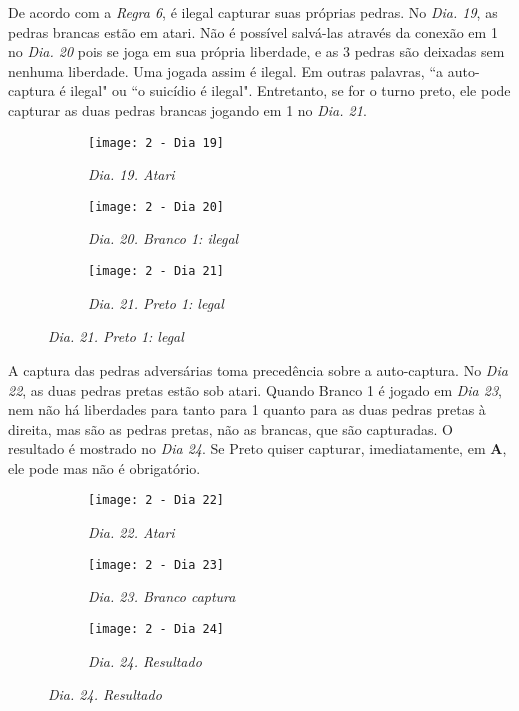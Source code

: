 \pagebreak

De acordo com a \emph{Regra 6}, é ilegal capturar suas próprias pedras. No \emph{Dia. 19}, as pedras brancas estão em atari. Não é possível salvá-las através da conexão em 1 no \emph{Dia. 20} pois se joga em sua própria liberdade, e as 3 pedras são deixadas sem nenhuma liberdade. Uma jogada assim é ilegal. Em outras palavras, ``a auto-captura é ilegal" ou ``o suicídio é ilegal". Entretanto, se for o turno preto, ele pode capturar as duas pedras brancas jogando em 1 no \emph{Dia. 21}.

\begin{figure}[h]
    \centering
    \begin{subfigure}[t]{.3\textwidth}
        \centering
        \texttt{[image: 2 - Dia 19]}
        \caption*{\emph{Dia. 19. Atari}}
    \end{subfigure}
    \begin{subfigure}[t]{.3\textwidth}
        \centering
        \texttt{[image: 2 - Dia 20]}
        \caption*{\emph{Dia. 20. Branco 1: ilegal}}
    \end{subfigure}
    \begin{subfigure}[t]{.3\textwidth}
        \centering
        \texttt{[image: 2 - Dia 21]}
        \caption*{\emph{Dia. 21. Preto 1: legal}}
    \end{subfigure}
\end{figure}

A captura das pedras adversárias toma precedência sobre a auto-captura. No \emph{Dia 22}, as duas pedras pretas estão sob atari. Quando Branco 1 é jogado em \emph{Dia 23}, nem não há liberdades para tanto para 1 quanto para as duas pedras pretas à direita, mas são as pedras pretas, não as brancas, que são capturadas. O resultado é mostrado no \emph{Dia 24}. Se Preto quiser capturar, imediatamente, em \textbf{A}, ele pode mas não é obrigatório.

\begin{figure}[h]
    \centering
    \begin{subfigure}[t]{.3\textwidth}
        \centering
        \texttt{[image: 2 - Dia 22]}
        \caption*{\emph{Dia. 22. Atari}}
    \end{subfigure}
    \begin{subfigure}[t]{.3\textwidth}
        \centering
        \texttt{[image: 2 - Dia 23]}
        \caption*{\emph{Dia. 23. Branco captura}}
    \end{subfigure}
    \begin{subfigure}[t]{.3\textwidth}
        \centering
        \texttt{[image: 2 - Dia 24]}
        \caption*{\emph{Dia. 24. Resultado}}
    \end{subfigure}
\end{figure}

